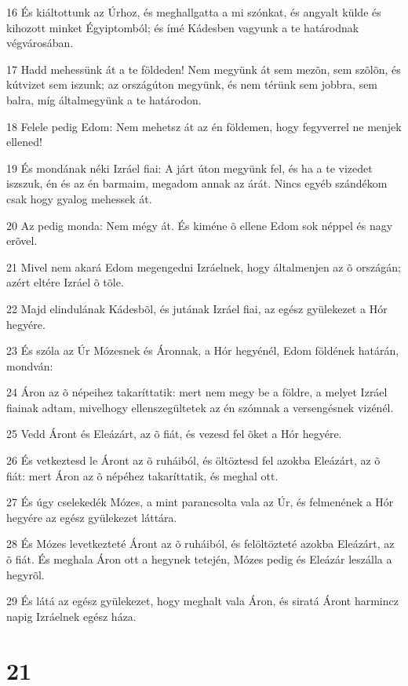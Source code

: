\par 16 És kiáltottunk az Úrhoz, és meghallgatta a mi szónkat, és  angyalt külde és kihozott minket Égyiptomból; és ímé Kádesben vagyunk a te határodnak végvárosában.
\par 17 Hadd mehessünk át a te földeden! Nem megyünk át sem mezõn, sem szõlõn, és kútvizet sem iszunk; az országúton megyünk, és nem térünk sem jobbra, sem balra, míg általmegyünk a te határodon.
\par 18 Felele pedig Edom: Nem mehetsz át az én földemen, hogy fegyverrel ne menjek ellened!
\par 19 És mondának néki Izráel fiai: A járt úton megyünk fel, és ha a te vizedet iszszuk, én és az én barmaim, megadom annak az árát. Nincs egyéb szándékom csak hogy gyalog mehessek át.
\par 20 Az pedig monda: Nem mégy át. És kiméne õ ellene Edom sok néppel és nagy erõvel.
\par 21 Mivel nem akará Edom megengedni Izráelnek, hogy általmenjen az õ országán; azért eltére Izráel õ tõle.
\par 22 Majd elindulának Kádesbõl, és jutának Izráel fiai, az egész gyülekezet a Hór hegyére.
\par 23 És szóla az Úr Mózesnek és Áronnak, a Hór hegyénél, Edom földének határán, mondván:
\par 24 Áron az õ népeihez takaríttatik: mert nem megy be a földre, a melyet Izráel fiainak adtam, mivelhogy ellenszegültetek az én szómnak a versengésnek vizénél.
\par 25 Vedd Áront és Eleázárt, az õ fiát, és vezesd fel õket a Hór hegyére.
\par 26 És vetkeztesd le Áront az õ ruháiból, és öltöztesd fel azokba Eleázárt, az õ fiát: mert Áron az õ népéhez takaríttatik, és meghal ott.
\par 27 És úgy cselekedék Mózes, a mint parancsolta vala az Úr, és felmenének a Hór hegyére az egész gyülekezet láttára.
\par 28 És Mózes levetkezteté Áront az õ ruháiból, és felöltözteté azokba Eleázárt, az õ fiát. És meghala Áron ott a hegynek tetején, Mózes pedig és Eleázár leszálla a hegyrõl.
\par 29 És látá az egész gyülekezet, hogy meghalt vala Áron, és siratá Áront harmincz napig Izráelnek egész háza.

\chapter{21}

